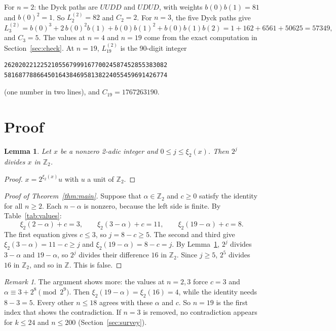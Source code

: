 \documentclass[11pt]{article}
\newtheorem{lemma}[theorem]{Lemma}
\theoremstyle{remark}
\newtheorem{remark}[theorem]{Remark}
\newcommand{\Z}{\mathbb{Z}}
\begin{document}
For $n=2$: the Dyck paths are $UUDD$ and $UDUD$, with weights $b(0)b(1)=81$ and $b(0)^2=1$. So $L^{(2)}_2=82$ and $C_2=2$. For $n=3$, the five Dyck paths give
\[L^{(2)}_3=b(0)^3+2\,b(0)^2b(1)+b(0)b(1)^2+b(0)b(1)b(2)=1+162+6561+50625=57349,\]
and $C_3=5$. The values at $n=4$ and $n=19$ come from the exact computation in Section~\ref{sec:check}. At $n=19$,
$L^{(2)}_{19}$ is the 90-digit integer
\begin{Verbatim}[fontsize=\small]
262020221225210556799916770024587452855383082
581687788664501643846958138224055459691426774
\end{Verbatim}
(one number in two lines), and $C_{19}=1767263190$.

\section{Proof}

\begin{lemma}\label{lem:dvd}
Let $x$ be a nonzero 2-adic integer and $0\le j\le \xi_2(x)$. Then $2^j$ divides $x$ in $\Z_2$.
\end{lemma}
\begin{proof}
$x=2^{\xi_2(x)}u$ with $u$ a unit of $\Z_2$.
\end{proof}

\begin{proof}[Proof of Theorem~\ref{thm:main}]
Suppose that $\alpha\in\Z_2$ and $c\ge0$ satisfy the identity for all $n\ge 2$. Each $n-\alpha$ is nonzero, because the left side is finite. By Table~\ref{tab:values}:
\[
\xi_2(2-\alpha)+c=3,\qquad \xi_2(3-\alpha)+c=11,\qquad \xi_2(19-\alpha)+c=8.
\]
The first equation gives $c\le 3$, so $j=8-c\ge 5$. The second and third give $\xi_2(3-\alpha)=11-c\ge j$ and $\xi_2(19-\alpha)=8-c=j$. By Lemma~\ref{lem:dvd}, $2^j$ divides $3-\alpha$ and $19-\alpha$, so $2^j$ divides their difference $16$ in $\Z_2$. Since $j\ge 5$, $2^5$ divides $16$ in $\Z_2$, and so in $\Z$. This is false.
\end{proof}

\begin{remark}
The argument shows more: the values at $n=2,3$ force $c=3$ and $\alpha\equiv 3+2^8\pmod{2^9}$. Then $\xi_2(19-\alpha)=\xi_2(16)=4$, while the identity needs $8-3=5$. Every other $n\le 18$ agrees with these $\alpha$ and $c$. So $n=19$ is the first index that shows the contradiction. If $n=3$ is removed, no contradiction appears for $k\le 24$ and $n\le 200$ (Section~\ref{sec:survey}).
\end{remark}
\end{document}
